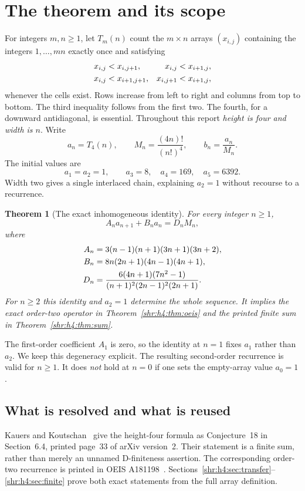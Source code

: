 \documentclass[11pt,letterpaper]{article}
\numberwithin{equation}{section}
\newtheorem{theorem}{Theorem}[section]
\theoremstyle{definition}
\newcommand{\1}{\mathbf 1}
\begin{document}
\section{The theorem and its scope}
\label{shr:h4:sec:scope}
For integers $m,n\ge1$, let $T_m(n)$ count the $m\times n$ arrays
$(x_{i,j})$ containing the integers $1,\ldots,mn$ exactly once and satisfying
\begin{align}
 x_{i,j}&<x_{i,j+1},& x_{i,j}&<x_{i+1,j},\notag\\
 x_{i,j}&<x_{i+1,j+1},&x_{i,j+1}&<x_{i+1,j},
 \label{shr:h4:eq:literal}
\end{align}
whenever the cells exist. Rows increase from left to right and columns from
top to bottom. The third inequality follows from the first two. The fourth,
for a downward antidiagonal, is essential. Throughout this report
\emph{height is four and width is $n$}. Write
\begin{equation}
 a_n=T_4(n),\qquad M_n=\frac{(4n)!}{(n!)^4},\qquad b_n=\frac{a_n}{M_n}.
 \label{shr:h4:eq:normalizers}
\end{equation}
The initial values are
\[
 a_1=a_2=1,\qquad a_3=8,\quad a_4=169,\quad a_5=6392.
\]
Width two gives a single interlaced chain, explaining $a_2=1$ without
recourse to a recurrence.

\begin{theorem}[The exact inhomogeneous identity]
\label{shr:h4:thm:main}
For every integer $n\ge1$,
\begin{equation}
 A_n a_{n+1}+B_n a_n=D_n M_n,
 \label{shr:h4:eq:inhom}
\end{equation}
where
\begin{align}
 A_n&=3(n-1)(n+1)(3n+1)(3n+2),\notag\\
 B_n&=8n(2n+1)(4n-1)(4n+1),\label{shr:h4:eq:ABD}\\
 D_n&=\frac{6(4n+1)(7n^2-1)}{(n+1)^2(2n-1)^2(2n+1)}.\notag
\end{align}
For $n\ge2$ this identity and $a_2=1$ determine the whole sequence.
It implies the exact order-two operator in Theorem~\ref{shr:h4:thm:oeis}
and the printed finite sum in Theorem~\ref{shr:h4:thm:sum}.
\end{theorem}

The first-order coefficient $A_1$ is zero, so the identity at $n=1$ fixes
$a_1$ rather than $a_2$. We keep this degeneracy explicit. The resulting
second-order recurrence is valid for $n\ge1$. It does \emph{not} hold at
$n=0$ if one sets the empty-array value $a_0=1$.

\subsection{What is resolved and what is reused}
Kauers and Koutschan~\cite{KK} give the height-four formula as
Conjecture~18 in Section~6.4, printed page~33 of arXiv version~2.
Their statement is a finite sum, rather than merely an unnamed
D-finiteness assertion. The corresponding order-two recurrence is printed
in OEIS A181198~\cite{oeis198int}. Sections~\ref{shr:h4:sec:transfer}--\ref{shr:h4:sec:finite}
prove both exact statements from the full array definition.
\end{document}
